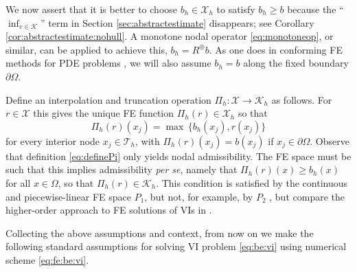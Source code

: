 \documentclass[hidelinks,onefignum,onetabnum,final]{siamart220329}  %
\newcommand{\cK}{\mathcal{K}}
\newcommand{\cT}{\mathcal{T}}
\newcommand{\cX}{\mathcal{X}}
\begin{document}
We now assert that it is better to choose $b_h \in \cX_h$ to satisfy $b_h\ge b$ because the ``$\inf_{v\in\cK}$'' term in Section \ref{sec:abstractestimate} disappears; see Corollary \ref{cor:abstractestimate:nohull}.  A monotone nodal operator \eqref{eq:monotoneop}, or similar, can be applied to achieve this, $b_h = R^\oplus b$.  As one does in conforming FE methods for PDE problems \cite{Elmanetal2014}, we will also assume $b_h=b$ along the fixed boundary $\partial\Omega$.

Define an interpolation and truncation operation $\Pi_h : \cX \to \cK_h$ as follows.  For $r\in\cX$ this gives the unique FE function $\Pi_h(r) \in \cX_h$ so that
\begin{equation}
\Pi_h(r)(x_j) = \max \,\{b_h(x_j), r(x_j)\} \label{eq:definePi}
\end{equation}
for every interior node $x_j \in \cT_h$, with $\Pi_h(r)(x_j)=b(x_j)$ if $x_j\in\partial\Omega$.  Observe that definition \eqref{eq:definePi} only yields nodal admissibility.  The FE space must be such that this implies admissibility \emph{per se}, namely that $\Pi_h(r)(x) \ge b_h(x)$ for all $x \in \Omega$, so that $\Pi_h(r) \in \cK_h$.  This condition is satisfied by the continuous and piecewise-linear FE space $P_1$, but not, for example, by $P_2$ \cite{BuelerFarrell2024}, but compare the higher-order approach to FE solutions of VIs in \cite{KeithSurowiec2023}.

Collecting the above assumptions and context, from now on we make the following standard assumptions for solving VI problem \eqref{eq:be:vi} using numerical scheme \eqref{eq:fe:be:vi}.
\end{document}
